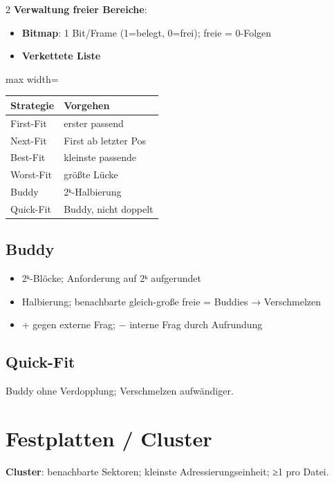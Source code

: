 \documentclass[10pt, a4paper]{article}
\begin{document}
\begin{multicols}{2}
\textbf{Verwaltung freier Bereiche}:

\begin{itemize}
  \item \textbf{Bitmap}: 1 Bit/Frame (1=belegt, 0=frei); freie = 0-Folgen
  \item \textbf{Verkettete Liste}
\end{itemize}


{\small
\begin{adjustbox}{max width=\linewidth}
{\scriptsize
\begin{tabular}{ll}
\toprule
\textbf{Strategie} & \textbf{Vorgehen} \\
\midrule
First-Fit & erster passend \\
Next-Fit & First ab letzter Pos \\
Best-Fit & kleinste passende \\
Worst-Fit & größte Lücke \\
Buddy & 2ᵏ-Halbierung \\
Quick-Fit & Buddy, nicht doppelt \\
\bottomrule
\end{tabular}
}
\end{adjustbox}
}



\subsection{Buddy}
\begin{itemize}
  \item 2ᵏ-Blöcke; Anforderung auf 2ᵏ aufgerundet
  \item Halbierung; benachbarte gleich-große freie = Buddies → Verschmelzen
  \item + gegen externe Frag; − interne Frag durch Aufrundung
\end{itemize}


\subsection{Quick-Fit}
Buddy ohne Verdopplung; Verschmelzen aufwändiger.



\section{Festplatten / Cluster}

\textbf{Cluster}: benachbarte Sektoren; kleinste Adressierungseinheit; ≥1 pro Datei.




\end{multicols}
\end{document}
